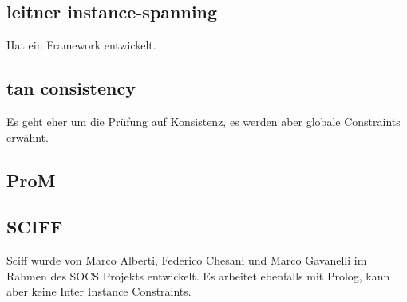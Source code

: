 \subsection{leitner instance-spanning}
Hat ein Framework entwickelt.
\subsection{tan consistency}
Es geht eher um die Prüfung auf Konsistenz, es werden aber globale Constraints erwähnt.




\subsection{ProM}
\subsection{SCIFF}
Sciff wurde von Marco Alberti, Federico Chesani und Marco Gavanelli im Rahmen des SOCS Projekts entwickelt. Es arbeitet ebenfalls mit Prolog, kann aber keine Inter Instance Constraints.



